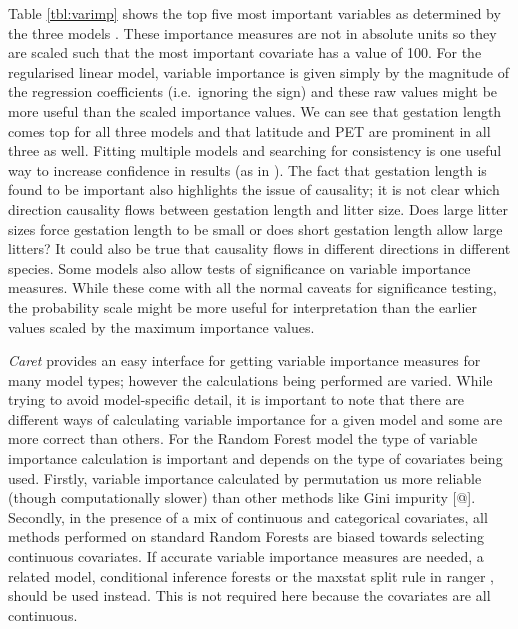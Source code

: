 \documentclass[10pt,]{article}
\begin{document}
Table \ref{tbl:varimp} shows the top five most important variables as determined by the three models \citep{oppel2009alternative}. These importance measures are not in absolute units so they are scaled such that the most important covariate has a value of 100. For the regularised linear model, variable importance is given simply by the magnitude of the regression coefficients (i.e.~ignoring the sign) and these raw values might be more useful than the scaled importance values. We can see that gestation length comes top for all three models and that latitude and PET are prominent in all three as well. Fitting multiple models and searching for consistency is one useful way to increase confidence in results (as in \citet{appelhans2015evaluating}). The fact that gestation length is found to be important also highlights the issue of causality; it is not clear which direction causality flows between gestation length and litter size. Does large litter sizes force gestation length to be small or does short gestation length allow large litters? It could also be true that causality flows in different directions in different species. Some models also allow tests of significance on variable importance measures. While these come with all the normal caveats for significance testing, the probability scale might be more useful for interpretation than the earlier values scaled by the maximum importance values.

\emph{Caret} provides an easy interface for getting variable importance measures for many model types; however the calculations being performed are varied. While trying to avoid model-specific detail, it is important to note that there are different ways of calculating variable importance for a given model \citep[\citet{oppel2009alternative}]{seifert2019surrogate} and some are more correct than others. For the Random Forest model the type of variable importance calculation is important and depends on the type of covariates being used. Firstly, variable importance calculated by permutation us more reliable (though computationally slower) than other methods like Gini impurity {[}@{]}. Secondly, in the presence of a mix of continuous and categorical covariates, all methods performed on standard Random Forests are biased towards selecting continuous covariates. If accurate variable importance measures are needed, a related model, conditional inference forests \citep{hothorn2006unbiased} or the maxstat split rule in ranger \citep{wright2017unbiased}, should be used instead. This is not required here because the covariates are all continuous.
\end{document}
